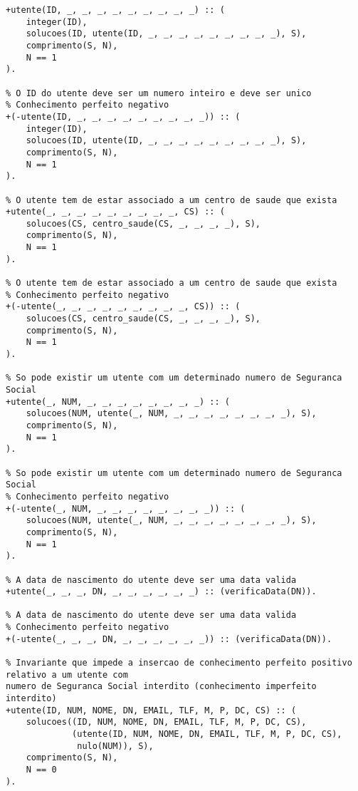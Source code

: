 \begin{lstlisting}[caption={Invariantes de inserção relativos ao predicado \texttt{utente}}]
% O ID do utente deve ser um numero inteiro e deve ser unico
+utente(ID, _, _, _, _, _, _, _, _, _) :: (
    integer(ID),
    solucoes(ID, utente(ID, _, _, _, _, _, _, _, _, _), S),
    comprimento(S, N),
    N == 1
).

% O ID do utente deve ser um numero inteiro e deve ser unico
% Conhecimento perfeito negativo
+(-utente(ID, _, _, _, _, _, _, _, _, _)) :: (
    integer(ID),
    solucoes(ID, utente(ID, _, _, _, _, _, _, _, _, _), S),
    comprimento(S, N),
    N == 1
).

% O utente tem de estar associado a um centro de saude que exista
+utente(_, _, _, _, _, _, _, _, _, CS) :: (
    solucoes(CS, centro_saude(CS, _, _, _, _), S),
    comprimento(S, N),
    N == 1
).

% O utente tem de estar associado a um centro de saude que exista
% Conhecimento perfeito negativo
+(-utente(_, _, _, _, _, _, _, _, _, CS)) :: (
    solucoes(CS, centro_saude(CS, _, _, _, _), S),
    comprimento(S, N),
    N == 1
).

% So pode existir um utente com um determinado numero de Seguranca Social
+utente(_, NUM, _, _, _, _, _, _, _, _) :: (
    solucoes(NUM, utente(_, NUM, _, _, _, _, _, _, _, _), S),
    comprimento(S, N),
    N == 1
).

% So pode existir um utente com um determinado numero de Seguranca Social
% Conhecimento perfeito negativo
+(-utente(_, NUM, _, _, _, _, _, _, _, _)) :: (
    solucoes(NUM, utente(_, NUM, _, _, _, _, _, _, _, _), S),
    comprimento(S, N),
    N == 1
).

% A data de nascimento do utente deve ser uma data valida
+utente(_, _, _, DN, _, _, _, _, _, _) :: (verificaData(DN)).

% A data de nascimento do utente deve ser uma data valida
% Conhecimento perfeito negativo
+(-utente(_, _, _, DN, _, _, _, _, _, _)) :: (verificaData(DN)).

% Invariante que impede a insercao de conhecimento perfeito positivo relativo a um utente com 
numero de Seguranca Social interdito (conhecimento imperfeito interdito)
+utente(ID, NUM, NOME, DN, EMAIL, TLF, M, P, DC, CS) :: (
    solucoes((ID, NUM, NOME, DN, EMAIL, TLF, M, P, DC, CS),
             (utente(ID, NUM, NOME, DN, EMAIL, TLF, M, P, DC, CS),
              nulo(NUM)), S),
    comprimento(S, N),
    N == 0
).

\end{lstlisting}

